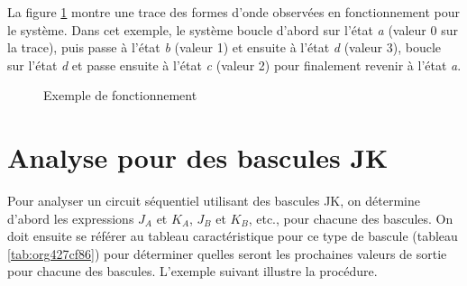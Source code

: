 \documentclass[letter, oneside]{book}
\begin{document}
La figure \ref{fig:org1555d63} montre une trace des formes d'onde
observées en fonctionnement pour le système. Dans cet exemple, le
système boucle d'abord sur l'état \emph{a} (valeur 0 sur la trace), puis
passe à l'état \emph{b} (valeur 1) et ensuite à l'état \emph{d} (valeur 3),
boucle sur l'état \emph{d} et passe ensuite à l'état \emph{c} (valeur 2) pour
finalement revenir à l'état \emph{a}.

\begin{figure}[htbp]
\centering

\caption{\label{fig:org1555d63}Exemple de fonctionnement}
\end{figure}

\section{Analyse pour des bascules JK}
\label{sec:org54e6015}

Pour analyser un circuit séquentiel utilisant des bascules JK, on
détermine d'abord les expressions \(J_A\) et \(K_A\), \(J_B\) et
\(K_B\), etc., pour chacune des bascules. On doit ensuite se référer
au tableau caractéristique pour ce type de bascule (tableau
\ref{tab:org427cf86}) pour déterminer quelles seront les prochaines valeurs
de sortie pour chacune des bascules. L'exemple suivant illustre la
procédure.
\end{document}
